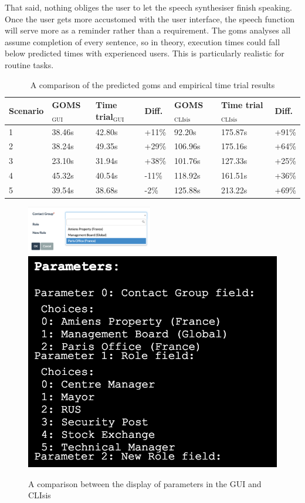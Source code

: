 That said, nothing obliges the user to let the speech synthesiser finish speaking. Once the user gets more accustomed with the user interface, the speech function will serve more as a reminder rather than a requirement. The \acrshort{goms} analyses all assume completion of every sentence, so in theory, execution times could fall below predicted times with experienced users. This is particularly realistic for routine tasks.

\begin{table}[h]
	\center
	
	\begin{tabular}{lllllll}
		\toprule
		Scenario		&	GOMS$_{\text{GUI}}$	& Time trial$_{\text{GUI}}$	& Diff. & GOMS$_{\text{CLIsis}}$	& Time trial$_{\text{CLIsis}}$	& Diff. \\		
		\midrule
		1	&	38.46s						& 42.80s							& +11\%					& 92.20s						& 175.87s							& +91\% \\
		2	& 38.24s						& 49.35s							& +29\%					& 106.96s					& 175.16s							& +64\% \\
		3	& 23.10s						& 31.94s							& +38\%					& 101.76s					& 127.33s							&	+25\%\\
		4	& 45.32s						& 40.54s							& -11\%					& 118.92s					& 161.51s							&	+36\%\\
		5	& 39.54s						& 38.68s							& -2\%						& 125.88s					& 213.22s							& +69\%\\
		\bottomrule
	\end{tabular}
	\caption{A comparison of the predicted \acrshort{goms} and empirical time trial results}
	\label{table:gomstimetrialcomparison}
\end{table}

\begin{figure}[h]
	\center
	\includegraphics[width=0.49\textwidth]{figures/paramsgui}
	\includegraphics[scale=.5]{figures/paramsclisis}
	\caption{A comparison between the display of parameters in the GUI and CLIsis}
	\label{figure:parametercomparison}
\end{figure}